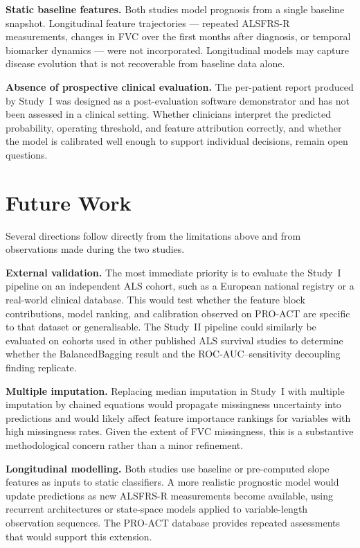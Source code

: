 \textbf{Static baseline features.} Both studies model prognosis from a single baseline snapshot. Longitudinal feature trajectories --- repeated \gls{ALSFRS-R} measurements, changes in \gls{FVC} over the first months after diagnosis, or temporal biomarker dynamics --- were not incorporated. Longitudinal models may capture disease evolution that is not recoverable from baseline data alone.

\textbf{Absence of prospective clinical evaluation.} The per-patient report produced by Study~I was designed as a post-evaluation software demonstrator and has not been assessed in a clinical setting. Whether clinicians interpret the predicted probability, operating threshold, and feature attribution correctly, and whether the model is calibrated well enough to support individual decisions, remain open questions.

\section{Future Work}
\label{sec:conclusion_future}

Several directions follow directly from the limitations above and from observations made during the two studies.

\textbf{External validation.} The most immediate priority is to evaluate the Study~I pipeline on an independent ALS cohort, such as a European national registry or a real-world clinical database. This would test whether the feature block contributions, model ranking, and calibration observed on \gls{PRO-ACT} are specific to that dataset or generalisable. The Study~II pipeline could similarly be evaluated on cohorts used in other published ALS survival studies to determine whether the BalancedBagging result and the \gls{ROC-AUC}--sensitivity decoupling finding replicate.

\textbf{Multiple imputation.} Replacing median imputation in Study~I with multiple imputation by chained equations would propagate missingness uncertainty into predictions and would likely affect feature importance rankings for variables with high missingness rates. Given the extent of \gls{FVC} missingness, this is a substantive methodological concern rather than a minor refinement.

\textbf{Longitudinal modelling.} Both studies use baseline or pre-computed slope features as inputs to static classifiers. A more realistic prognostic model would update predictions as new \gls{ALSFRS-R} measurements become available, using recurrent architectures or state-space models applied to variable-length observation sequences. The \gls{PRO-ACT} database provides repeated assessments that would support this extension.


